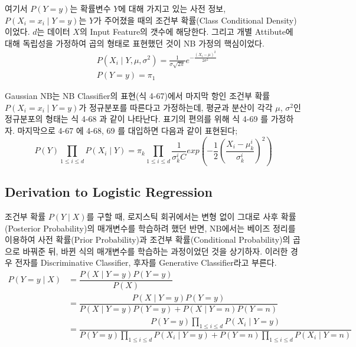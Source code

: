 \documentclass[a4paper]{oblivoir}
\begin{document}
\indent 여기서 $P(Y=y)$는 확률변수 $Y$에 대해 가지고 있는 사전 정보, $P(X_{i} = x_{i} \mid Y=y)$는 $Y$가 주어졌을 때의 조건부 확률(Class Conditional Density)이었다. $d$는 데이터 $X$의 Input Feature의 갯수에 해당한다. 그리고 개별 Attibute에 대해 독립성을 가정하여 곱의 형태로 표현했던 것이 NB 가정의 핵심이었다.
\begin{align}
&P(X_{i} \mid Y, \mu, \sigma^{2}) = \frac{1}{\sigma \sqrt{2 \pi}}e^{-\frac{(X_{i}-\mu)^{2}}{2 \sigma^{2}}} \tag{4-68} \\
&P(Y=y) = \pi_{1} \tag{4-69}
\end{align}
 
\indent Gaussian NB는 NB Classifier의 표현(식 4-67)에서 마지막 항인 조건부 확률 $P(X_{i} = x_{i} \mid Y=y)$가 정규분포를 따른다고 가정하는데, 평균과 분산이 각각 $\mu$, $\sigma^{2}$인 정규분포의 형태는 식 4-68 과 같이 나타난다. 표기의 편의를 위해 식 4-69 를 가정하자. 마지막으로 4-67 에 4-68, 69 를 대입하면 다음과 같이 표현된다;
\begin{equation}
P(Y)\prod_{1 \leq i \leq d}P(X_{i} \mid Y) = \pi_{k}\prod_{1 \leq i \leq d}\frac{1}{\sigma_{k}^{i}C}exp\left( -\frac{1}{2}\left(\frac{X_{i}-\mu_{k}^{i}}{\sigma_{k}^{i}}\right)^{2} \right) \tag{4-70}
\end{equation}

\subsection{Derivation to Logistic Regression}
조건부 확률 $P(Y \mid X)$를 구할 때, 로지스틱 회귀에서는 변형 없이 그대로 사후 확률(Posterior Probability)의 매개변수를 학습하려 했던 반면, NB에서는 베이즈 정리를 이용하여 사전 확률(Prior Probability)과 조건부 확률(Conditional Probability)의 곱으로 바꿔준 뒤, 바뀐 식의 매개변수를 학습하는 과정이었던 것을 상기하자. 이러한 경우 전자를 Discriminative Classifier, 후자를 Generative Classifier라고 부른다.
\begin{align}
P(Y=y \mid X) &= \dfrac{P(X \mid Y=y)P(Y=y)}{P(X)} \tag{4-71}\\
&=\dfrac{P(X \mid Y=y)P(Y=y)}{P(X \mid Y=y)P(Y=y) + P(X \mid Y=n)P(Y=n)} \tag{4-72}\\
&=\dfrac{P(Y=y)\prod_{1 \leq i \leq d}P(X_{i} \mid Y=y)}{P(Y=y)\prod_{1 \leq i \leq d}P(X_{i} \mid Y=y) + P(Y=n)\prod_{1 \leq i \leq d}P(X_{i} \mid Y=n)} \tag{4-73}
\end{align}
\end{document}
